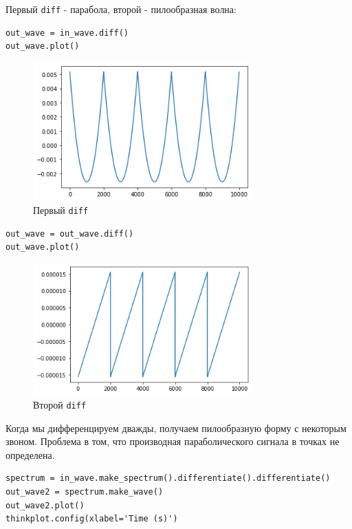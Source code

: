 \documentclass[a4paper,12pt]{report}
\begin{document}
Первый \texttt{diff} - парабола, второй - пилообразная волна:

\begin{lstlisting}[caption=Первый \texttt{diff}]
out_wave = in_wave.diff()
out_wave.plot()
\end{lstlisting}

\begin{figure}[H]
        \centering
        \includegraphics[width=0.75\textwidth]{lab9_fig5_2.png}
        \caption{Первый \texttt{diff}}
        \label{fig:lab9_fig5_2}
\end{figure}

\begin{lstlisting}[caption=Второй \texttt{diff}]
out_wave = out_wave.diff()
out_wave.plot()
\end{lstlisting}

\begin{figure}[H]
        \centering
        \includegraphics[width=0.75\textwidth]{lab9_fig5_3.png}
        \caption{Второй \texttt{diff}}
        \label{fig:lab9_fig5_3}
\end{figure}

Когда мы дифференцируем дважды, получаем пилообразную форму с некоторым звоном. Проблема в том, что производная параболического сигнала в точках не определена.

\begin{lstlisting}[caption=Вторая производная]
spectrum = in_wave.make_spectrum().differentiate().differentiate()
out_wave2 = spectrum.make_wave()
out_wave2.plot()
thinkplot.config(xlabel='Time (s)')
\end{lstlisting}
\end{document}
